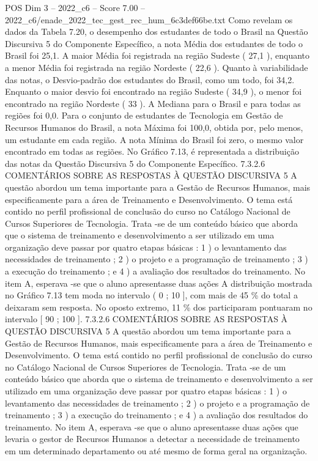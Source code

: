 \begin{textsample}{POS Dim 3 – 2022\_c6 – Score 7.00 – 2022\_c6/enade\_2022\_tec\_gest\_rec\_hum\_6c3def66be.txt}
Como revelam os dados da Tabela 7.20, o desempenho dos estudantes de todo o Brasil na Questão Discursiva 5 do Componente Específico, a nota Média dos estudantes de todo o Brasil foi 25,1.
A maior Média foi registrada na região Sudeste ( 27,1 ), enquanto a menor Média foi registrada na região Nordeste ( 22,6 ).
Quanto à variabilidade das notas, o Desvio-padrão dos estudantes do Brasil, como um todo, foi 34,2.
Enquanto o maior desvio foi encontrado na região Sudeste ( 34,9 ), o menor foi encontrado na região Nordeste ( 33 ).
A Mediana para o Brasil e para todas as regiões foi 0,0.
Para o conjunto de estudantes de Tecnologia em Gestão de Recursos Humanos do Brasil, a nota Máxima foi 100,0, obtida por, pelo menos, um estudante em cada região.
A nota Mínima do Brasil foi zero, o mesmo valor encontrado em todas as regiões.
No Gráfico 7.13, é representada a distribuição das notas da Questão Discursiva 5 do Componente Específico. 7.3.2.6 COMENTÁRIOS SOBRE AS RESPOSTAS À QUESTÃO DISCURSIVA 5 A questão abordou um tema importante para a Gestão de Recursos Humanos, mais especificamente para a área de Treinamento e Desenvolvimento.
O tema está contido no perfil profissional de conclusão do curso no Catálogo Nacional de Cursos Superiores de Tecnologia.
Trata -se de um conteúdo básico que aborda que o sistema de treinamento e desenvolvimento a ser utilizado em uma organização deve passar por quatro etapas básicas : 1 ) o levantamento das necessidades de treinamento ; 2 ) o projeto e a programação de treinamento ; 3 ) a execução do treinamento ; e 4 ) a avaliação dos resultados do treinamento.
No item A, esperava -se que o aluno apresentasse duas ações A distribuição mostrada no Gráfico 7.13 tem moda no intervalo ( 0 ; 10 ], com mais de 45 \% do total a deixaram sem resposta.
No oposto extremo, 11 \% dos participaram pontuaram no intervalo [ 90 ; 100 ]. 7.3.2.6 COMENTÁRIOS SOBRE AS RESPOSTAS À QUESTÃO DISCURSIVA 5 A questão abordou um tema importante para a Gestão de Recursos Humanos, mais especificamente para a área de Treinamento e Desenvolvimento.
O tema está contido no perfil profissional de conclusão do curso no Catálogo Nacional de Cursos Superiores de Tecnologia.
Trata -se de um conteúdo básico que aborda que o sistema de treinamento e desenvolvimento a ser utilizado em uma organização deve passar por quatro etapas básicas : 1 ) o levantamento das necessidades de treinamento ; 2 ) o projeto e a programação de treinamento ; 3 ) a execução do treinamento ; e 4 ) a avaliação dos resultados do treinamento.
No item A, esperava -se que o aluno apresentasse duas ações que levaria o gestor de Recursos Humanos a detectar a necessidade de treinamento em um determinado departamento ou até mesmo de forma geral na organização.

\end{textsample}
